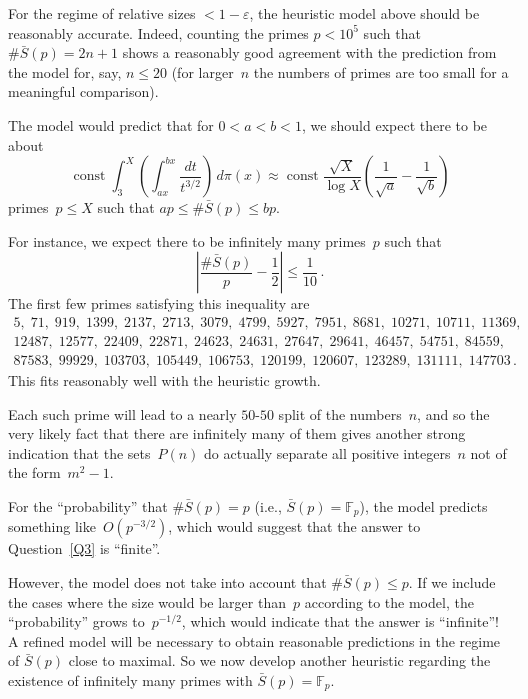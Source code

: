 \documentclass[12pt,a4paper]{amsart}
\newcommand{\F}{{\mathbb F}}
\theoremstyle{definition}
\numberwithin{equation}{section}
\begin{document}
For the regime of relative sizes $< 1 - \varepsilon$, the heuristic model above
should be reasonably accurate. Indeed, counting the primes $p < 10^5$ such that $\#\bar{S}(p) = 2n+1$
shows a reasonably good agreement with the prediction from the model for, say, $n \leqslant 20$
(for larger~$n$ the numbers of primes are too small for a meaningful comparison).

The model would predict that for $0 < a < b < 1$, we should expect
there to be about
\[ \operatorname{const} \int_3^X \left(\int_{ax}^{bx} \frac{dt}{t^{3/2}}\right)\, d\pi(x)
     \approx \operatorname{const} \frac{\sqrt{X}}{\log X} \left(\frac{1}{\sqrt{a}} - \frac{1}{\sqrt{b}}\right)
\]
primes~$p \leqslant X$ such that $a p \leqslant \#\bar{S}(p) \leqslant b p$.

For instance, we expect there to be infinitely many primes~$p$ such that
\[ \left|\frac{\#\bar{S}(p)}{p} - \frac{1}{2}\right| \leqslant \frac{1}{10} \,. \]
The first few primes satisfying this inequality are
\begin{gather*}
  5, \; 71, \; 919, \; 1399, \; 2137, \; 2713, \; 3079, \; 4799, \; 5927, \; 7951, \; 8681, \; 10271, \; 10711, \; 11369, \\
  12487, \; 12577, \; 22409, \; 22871, \; 24623, \; 24631, \; 27647, \; 29641, \; 46457, \; 54751, \; 84559, \\
  87583, \; 99929, \; 103703, \; 105449, \; 106753, \; 120199, \; 120607, \; 123289, \; 131111, \; 147703\,.
\end{gather*}
This fits reasonably well with the heuristic growth.

Each such prime will lead to a nearly $50$-$50$ split of the numbers~$n$, and so
the very likely fact that there are infinitely many of them gives another strong indication
that the sets~$P(n)$ do actually separate all positive integers~$n$ not of the form~$m^2 - 1$.


\medskip

For the ``probability'' that $\#\bar{S}(p) = p$ (i.e., $\bar{S}(p) = \F_p$), the model
predicts something like~$O(p^{-3/2})$, which would suggest that the answer to Question~\ref{Q3}
is ``finite''.

However, the model does not take into account that $\#\bar{S}(p) \leqslant p$. If we
include the cases where the size would be larger than~$p$ according to the model,
the ``probability'' grows to~$p^{-1/2}$, which would indicate that the answer is ``infinite''!
A refined model will be necessary to obtain reasonable predictions in the regime
of $\bar{S}(p)$ close to maximal. So we now develop
another heuristic regarding the existence of infinitely many primes with $\bar{S}(p) = \F_p$.
\end{document}
